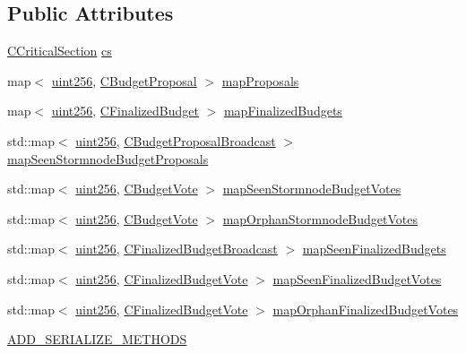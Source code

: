 \subsection*{Public Attributes}
\begin{DoxyCompactItemize}
\item 
\hyperlink{sync_8h_a37a4692b2d517f2843655ca11af7668a}{C\+Critical\+Section} \hyperlink{class_c_budget_manager_a67d5cdc1a964de128a2ba4d4b5590ebd}{cs}
\item 
map$<$ \hyperlink{classuint256}{uint256}, \hyperlink{class_c_budget_proposal}{C\+Budget\+Proposal} $>$ \hyperlink{class_c_budget_manager_a25d2d0ede6489ea2069e1089dae39f49}{map\+Proposals}
\item 
map$<$ \hyperlink{classuint256}{uint256}, \hyperlink{class_c_finalized_budget}{C\+Finalized\+Budget} $>$ \hyperlink{class_c_budget_manager_a68738720aa55de4b90fb10fb584547a9}{map\+Finalized\+Budgets}
\item 
std\+::map$<$ \hyperlink{classuint256}{uint256}, \hyperlink{class_c_budget_proposal_broadcast}{C\+Budget\+Proposal\+Broadcast} $>$ \hyperlink{class_c_budget_manager_a5336c99bc4c72c185de0391165a67159}{map\+Seen\+Stormnode\+Budget\+Proposals}
\item 
std\+::map$<$ \hyperlink{classuint256}{uint256}, \hyperlink{class_c_budget_vote}{C\+Budget\+Vote} $>$ \hyperlink{class_c_budget_manager_af729951208566289252458a01ed9fc7a}{map\+Seen\+Stormnode\+Budget\+Votes}
\item 
std\+::map$<$ \hyperlink{classuint256}{uint256}, \hyperlink{class_c_budget_vote}{C\+Budget\+Vote} $>$ \hyperlink{class_c_budget_manager_a624092b33094fec6d113a94e79647c90}{map\+Orphan\+Stormnode\+Budget\+Votes}
\item 
std\+::map$<$ \hyperlink{classuint256}{uint256}, \hyperlink{class_c_finalized_budget_broadcast}{C\+Finalized\+Budget\+Broadcast} $>$ \hyperlink{class_c_budget_manager_a289e14968fc776b8c0570b03ea8c8ecd}{map\+Seen\+Finalized\+Budgets}
\item 
std\+::map$<$ \hyperlink{classuint256}{uint256}, \hyperlink{class_c_finalized_budget_vote}{C\+Finalized\+Budget\+Vote} $>$ \hyperlink{class_c_budget_manager_aecbf6ad23e6f6044672d5619d3e7c40d}{map\+Seen\+Finalized\+Budget\+Votes}
\item 
std\+::map$<$ \hyperlink{classuint256}{uint256}, \hyperlink{class_c_finalized_budget_vote}{C\+Finalized\+Budget\+Vote} $>$ \hyperlink{class_c_budget_manager_ad0d6a72545f4057ff5ffba11fc122ac7}{map\+Orphan\+Finalized\+Budget\+Votes}
\item 
\hyperlink{class_c_budget_manager_a078aded2505dc7329f29b0bd240b1649}{A\+D\+D\+\_\+\+S\+E\+R\+I\+A\+L\+I\+Z\+E\+\_\+\+M\+E\+T\+H\+O\+D\+S}
\end{DoxyCompactItemize}


